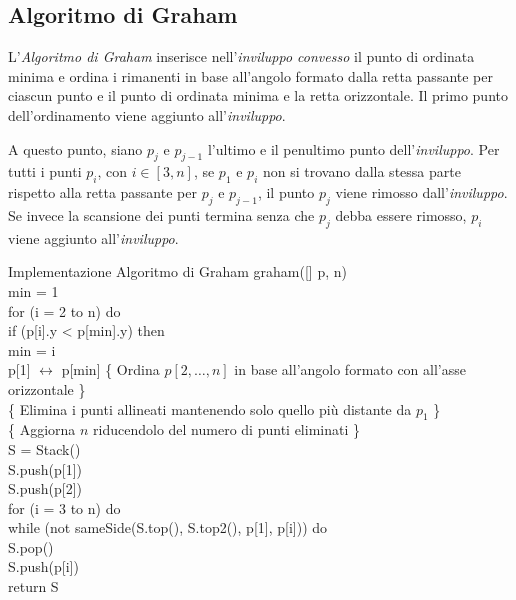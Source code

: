 \subsection{Algoritmo di Graham}
L'\emph{Algoritmo di Graham} inserisce nell'\emph{inviluppo convesso} il punto di
ordinata minima e ordina i rimanenti in base all'angolo formato dalla retta
passante per ciascun punto e il punto di ordinata minima e la retta orizzontale.
Il primo punto dell'ordinamento viene aggiunto all'\emph{inviluppo}.

A questo punto, siano $p_j$ e $p_{j-1}$ l'ultimo e il penultimo punto
dell'\emph{inviluppo}. Per tutti i punti $p_i$, con $i\in[3,n]$, se $p_1$ e
$p_i$ non si trovano dalla stessa parte rispetto alla retta passante per $p_j$
e $p_{j-1}$, il punto $p_j$ viene rimosso dall'\emph{inviluppo}. Se invece
la scansione dei punti termina senza che $p_j$ debba essere rimosso, $p_i$
viene aggiunto all'\emph{inviluppo}.

\begin{minicode}{Implementazione Algoritmo di Graham}
\ind{} graham([] p,  n)\\
     min = 1\\
    \indf for (i = 2 to n) do\\
        \indff if (p[i].y < p[min].y) then\\
            min = i\\
    \indf p[1] $\leftrightarrow$ p[min]\hfill{}
    \indf\{ Ordina $p[2,\dots, n]$ in base all'angolo formato con all'asse
    orizzontale \}\\
    \indf\{ Elimina i punti allineati mantenendo solo quello più distante
    da $p_1$ \}\\
    \indf\{ Aggiorna $n$ riducendolo del numero di punti eliminati \}\\
    \indf{} S = Stack()\\
    \indf S.push(p[1])\\
    \indf S.push(p[2])\\
    \indf for (i = 3 to n) do\\
        \indff while (not sameSide(S.top(), S.top2(), p[1], p[i])) do\\
            S.pop()\\
        \indff S.push(p[i])\\
    \indf return S
\end{minicode}

